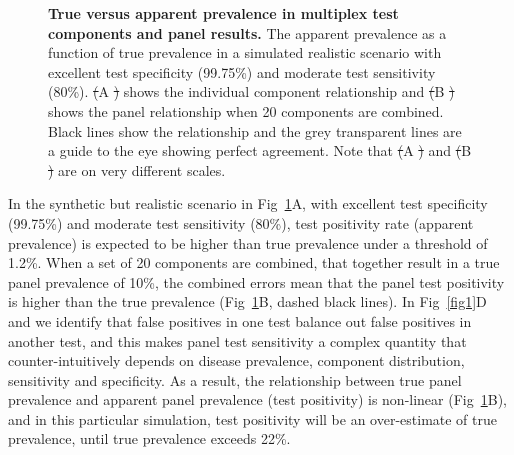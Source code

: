 \documentclass[10pt,letterpaper]{article}
\providecommand{\DIFaddtex}[1]{{\protect\color{blue}\uwave{#1}}} %
\providecommand{\DIFdeltex}[1]{{\protect\color{red}\sout{#1}}}                      %
\providecommand{\DIFaddFL}[1]{\DIFadd{#1}} %
\providecommand{\DIFdelFL}[1]{\DIFdel{#1}} %
\providecommand{\DIFaddbeginFL}{} %
\providecommand{\DIFaddendFL}{} %
\providecommand{\DIFdelbeginFL}{} %
\providecommand{\DIFdelendFL}{} %
\providecommand{\DIFadd}[1]{\texorpdfstring{\DIFaddtex{#1}}{#1}} %
\providecommand{\DIFdel}[1]{\texorpdfstring{\DIFdeltex{#1}}{}} %
\newcommand{\DIFscaledelfig}{0.5}
\newlength{\DIFdelgraphicswidth} %
\newlength{\DIFdelgraphicsheight} %
\newcommand{\DIFaddincludegraphics}[2][]{{\color{blue}\fbox{\DIFOincludegraphics[#1]{#2}}}} %
\newcommand{\DIFdelincludegraphics}[2][]{%
\sbox{\DIFdelgraphicsbox}{\DIFOincludegraphics[#1]{#2}}%
\settoboxwidth{\DIFdelgraphicswidth}{\DIFdelgraphicsbox} %
\settoboxtotalheight{\DIFdelgraphicsheight}{\DIFdelgraphicsbox} %
\scalebox{\DIFscaledelfig}{%
\parbox[b]{\DIFdelgraphicswidth}{\usebox{\DIFdelgraphicsbox}\\[-\baselineskip] \rule{\DIFdelgraphicswidth}{0em}}\llap{\resizebox{\DIFdelgraphicswidth}{\DIFdelgraphicsheight}{%
\setlength{\unitlength}{\DIFdelgraphicswidth}%
\begin{picture}(1,1)%
\thicklines\linethickness{2pt} %
{\color[rgb]{1,0,0}\put(0,0){\framebox(1,1){}}}%
{\color[rgb]{1,0,0}\put(0,0){\line( 1,1){1}}}%
{\color[rgb]{1,0,0}\put(0,1){\line(1,-1){1}}}%
\end{picture}%
}\hspace*{3pt}}} %
} %
\DeclareRobustCommand{\DIFaddbeginFL}{\DIFOaddbeginFL \let\includegraphics\DIFaddincludegraphics} %
\DeclareRobustCommand{\DIFaddendFL}{\DIFOaddendFL \let\includegraphics\DIFOincludegraphics} %
\DeclareRobustCommand{\DIFdelbeginFL}{\DIFOdelbeginFL \let\includegraphics\DIFdelincludegraphics} %
\DeclareRobustCommand{\DIFdelendFL}{\DIFOaddendFL \let\includegraphics\DIFOincludegraphics} %
\begin{document}
\begin{figure}[ht!]
\caption{{\bf True versus apparent prevalence in multiplex test components and panel results.}
The apparent prevalence as a function of true prevalence in a simulated realistic scenario with excellent test specificity (99.75\%) and moderate test sensitivity (80\%). \DIFdelbeginFL \DIFdelFL{(}\DIFdelendFL \DIFaddbeginFL \DIFaddFL{Fig~\ref{fig3}}\DIFaddendFL A \DIFdelbeginFL \DIFdelFL{) }\DIFdelendFL shows the individual component relationship and \DIFdelbeginFL \DIFdelFL{(}\DIFdelendFL \DIFaddbeginFL \DIFaddFL{Fig~\ref{fig3}}\DIFaddendFL B \DIFdelbeginFL \DIFdelFL{) }\DIFdelendFL shows the panel relationship when 20 components are combined. Black lines show the relationship and the grey transparent lines are a guide to the eye showing perfect agreement. Note that \DIFdelbeginFL \DIFdelFL{(}\DIFdelendFL \DIFaddbeginFL \DIFaddFL{Fig~\ref{fig3}}\DIFaddendFL A \DIFdelbeginFL \DIFdelFL{) }\DIFdelendFL and \DIFdelbeginFL \DIFdelFL{(}\DIFdelendFL \DIFaddbeginFL \DIFaddFL{\ref{fig3}}\DIFaddendFL B \DIFdelbeginFL \DIFdelFL{) }\DIFdelendFL are on very different scales.
}
\label{fig3}
\end{figure}

In the synthetic but realistic scenario in Fig~\ref{fig3}A, with excellent test specificity (99.75\%) and moderate test sensitivity (80\%), test positivity rate (apparent prevalence) is expected to be higher than true prevalence under a threshold of 1.2\%. When a set of 20 components are combined, that together result in a true panel prevalence of 10\%, the combined errors mean that the panel test positivity is higher than the true prevalence (Fig~\ref{fig3}B, dashed black lines). In Fig~\ref{fig1}D and  we identify that false positives in one test balance out false positives in another test, and this makes panel test sensitivity a complex quantity that counter-intuitively depends on disease prevalence, component distribution, sensitivity and specificity. As a result, the relationship between true panel prevalence and apparent panel prevalence (test positivity) is non-linear (Fig~\ref{fig3}B), and in this particular simulation, test positivity will be an over-estimate of true prevalence, until true prevalence exceeds 22\%.
\end{document}
